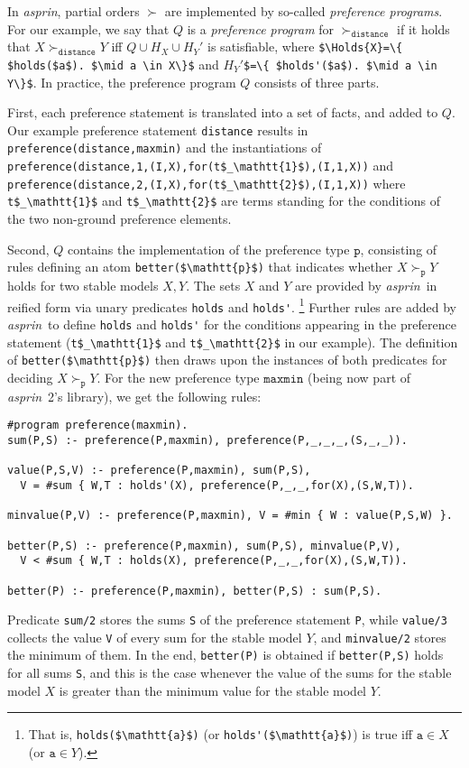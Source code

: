 \documentclass[a4paper,UKenglish]{oasics}
\newcommand{\lm}[1]{\lstinline[mathescape=true]!#1!}
\newcommand{\Holds}[1]{\ensuremath{{H}_{#1}}} %
\newcommand{\Holdsp}[1]{\ensuremath{{H}_{#1}'}} %
\newcommand{\sysfont}{\textit}
\newcommand{\asprin}{\sysfont{asprin}}
\begin{document}
%
%
%
%
In \asprin, partial orders $\succ$ are implemented by so-called \emph{preference programs}. 
%
For our example, we say that $Q$ is a \emph{preference program} for $\succ_\mathtt{distance}$ if it holds that
$X \succ_\mathtt{distance} Y$ iff $Q \cup \Holds{X} \cup \Holdsp{Y}$ is satisfiable, 
where \lm{$\Holds{X}=\{ $holds($a$). $\mid a \in X\}$}
and   $\Holdsp{Y}$\lm{$=\{ $holds'($a$). $\mid a \in Y\}$}.
%
In practice, the preference program $Q$ consists of three parts.

%
First, %
each preference statement is translated into a set of facts, and added to $Q$.
Our example preference statement \lm{distance} results in
\lm{preference(distance,maxmin)} 
and the instantiations of 
\lm{preference(distance,1,(I,X),for(t$_\mathtt{1}$),(I,1,X))} 
and 
\lm{preference(distance,2,(I,X),for(t$_\mathtt{2}$),(I,1,X))}
where \lm{t$_\mathtt{1}$} and \lm{t$_\mathtt{2}$} are terms 
standing for the conditions of the two non-ground preference elements.

Second, %
$Q$ contains the implementation of the preference type $\mathtt{p}$,
consisting of rules defining an atom \lstinline[mathescape]!better($\mathtt{p}$)! 
that indicates whether $X\succ_{\mathtt{p}}Y$ holds for two stable models $X,Y$.
The sets $X$ and $Y$ are provided by \asprin\ in reified form via unary predicates \lstinline!holds! and \lstinline!holds'!\!.%
\footnote{That is, \lstinline[mathescape]!holds($\mathtt{a}$)!\! (or \lstinline!holds'!\!\!\lstinline[mathescape]!($\mathtt{a}$)!\!) is true iff $\mathtt{a}\!\in\!X$ (or $\mathtt{a}\!\in\!Y$).}
%
Further rules are added by \asprin\ to define \lstinline!holds! and \lstinline!holds'! for
the conditions appearing in the preference statement (\lm{t$_\mathtt{1}$} and \lm{t$_\mathtt{2}$} in our example).
%
The definition of \lstinline[mathescape]!better($\mathtt{p}$)! then draws upon the instances of both predicates for deciding $X\succ_{\mathtt{p}}Y$.
%
For the new preference type $\mathtt{maxmin}$ (being now part of \asprin\ 2's library),
we get the following rules:
%
\begin{lstlisting}
#program preference(maxmin).
sum(P,S) :- preference(P,maxmin), preference(P,_,_,_,(S,_,_)).

value(P,S,V) :- preference(P,maxmin), sum(P,S), 
  V = #sum { W,T : holds'(X), preference(P,_,_,for(X),(S,W,T)).

minvalue(P,V) :- preference(P,maxmin), V = #min { W : value(P,S,W) }.

better(P,S) :- preference(P,maxmin), sum(P,S), minvalue(P,V),
  V < #sum { W,T : holds(X), preference(P,_,_,for(X),(S,W,T)).

better(P) :- preference(P,maxmin), better(P,S) : sum(P,S).
\end{lstlisting}
Predicate \lm{sum/2} stores the sums \lm{S} of the preference statement \lm{P},  
while \lstinline!value/3! collects the value \lm{V} of every sum for the stable model $Y$, 
and \lstinline!minvalue/2! stores the minimum of them.
In the end, \lstinline{better(P)} is obtained if \lstinline{better(P,S)} holds for all sums \lm{S}, 
and this is the case whenever the value of the sums for the stable model $X$ 
is greater than the minimum value for the stable model $Y$.
\end{document}
